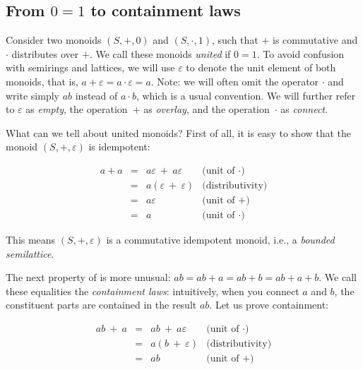 \documentclass[english,submission]{programming}
\begin{document}
\subsection{From $0=1$ to containment laws}

Consider two monoids $(S, +, 0)$ and $(S, \cdot, 1)$, such that $+$ is
commutative and $\cdot$ distributes over $+$. We call these monoids
\emph{united} if $0 = 1$. To avoid confusion with semirings and lattices, we
will use $\varepsilon$ to denote the unit element of both monoids, that is,
$a + \varepsilon = a \cdot \varepsilon = a$. Note: we will often omit the
operator $\cdot$ and write simply $\textit{ab}$ instead of $a \cdot b$, which is
a usual convention. We will further refer to $\varepsilon$ as \emph{empty}, the
operation~$+$ as \emph{overlay}, and the operation~$\cdot$ as \emph{connect}.

\newpage
\noindent
What can we tell about united monoids? First of all, it is easy to show that the
monoid $(S, +, \varepsilon)$ is idempotent:

\vspace{-5mm}
\begin{equation*}
\begin{array}{rcll}
a + a & = & a\varepsilon\ +\ a\varepsilon & \text{(unit of $\cdot$)}\\
 & = & a(\varepsilon\ +\ \varepsilon) & \text{(distributivity)}\\
 & = & a\varepsilon & \text{(unit of $+$)}\\
 & = & a & \text{(unit of $\cdot$)}
\end{array}
\end{equation*}
\vspace{-3mm}

\noindent
This means $(S, +, \varepsilon)$ is a commutative idempotent monoid, i.e.,
a \emph{bounded semilattice}.

The next property of is more unusual:
$\textit{ab} = \textit{ab} + a = \textit{ab} + b = \textit{ab} + a + b$. We
call these equalities the \emph{containment laws}: intuitively, when you
connect $a$ and $b$, the constituent parts are contained in the result
$\textit{ab}$. Let us prove containment:

\vspace{-5mm}
\begin{equation*}
\begin{array}{rcll}
\textit{ab}\ +\ a & = & \textit{ab}\ +\ a\varepsilon & \text{(unit of $\cdot$)}\\
 & = & a(b\ +\ \varepsilon) & \text{(distributivity)}\\
 & = & \textit{ab} & \text{(unit of $+$)}\\
\end{array}
\end{equation*}
\vspace{-3mm}
\end{document}
